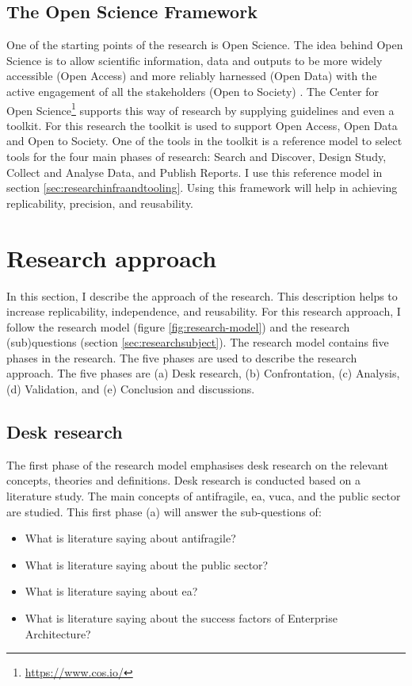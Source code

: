 \subsection{The Open Science Framework}
\label{sub:osf}
One of the starting points of the research is Open Science. The idea behind Open Science is to allow scientific information, data and outputs to be more widely accessible (Open Access) and more reliably harnessed (Open Data) with the active engagement of all the stakeholders (Open to Society) \parencite{UNESCO2020}. The Center for Open Science\footnote{{\url{https://www.cos.io/}}} supports this way of research by supplying guidelines and even a toolkit. For this research the toolkit is used to support Open Access, Open Data and Open to Society. One of the tools in the toolkit is a reference model to select tools for the four main phases of research: Search and Discover, Design Study, Collect and Analyse Data, and Publish Reports. I use this reference model in section \ref{sec:researchinfraandtooling}. Using this framework will help in achieving replicability, precision, and reusability.
\section{Research approach}
\label{sec:researchapproach}
In this section, I describe the approach of the research. This description helps to increase replicability, independence, and reusability. For this research approach, I follow the research model (figure \ref{fig:research-model}) and the research (sub)questions (section \ref{sec:researchsubject}). The research model contains five phases in the research. The five phases are used to describe the research approach. The five phases are (a) Desk research, (b) Confrontation, (c) Analysis, (d) Validation, and (e) Conclusion and discussions.

\subsection{Desk research}
\label{sub:deskresearchphase}
The first phase of the research model emphasises desk research on the relevant concepts, theories and definitions. Desk research is conducted based on a literature study. The main concepts of \gls{antifragile}, \acrshort{ea}, \acrshort{vuca}, and the public sector are studied. This first phase (a) will answer the sub-questions of:
\begin{itemize}
	\item{What is literature saying about \gls{antifragile}?}
	\item{What is literature saying about the public sector?}
	\item{What is literature saying about \acrlong{ea}?}
	\item{What is literature saying about the success factors of Enterprise Architecture?}
\end{itemize}


